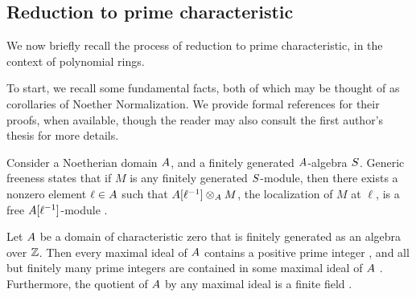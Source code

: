 \documentclass{amsart}
\begin{document}
 
\subsection{Reduction to prime characteristic}

We now briefly recall the process of reduction to prime characteristic, in the context of polynomial rings.

To start, we recall some fundamental facts, both of which may be thought of as corollaries of Noether Normalization.
We provide formal references for their proofs, when available, though the reader may also consult the first author's thesis \cite[Chapter~3]{hernandez.thesis} for more details.

\begin{remark}\label{generic-freeness}
   Consider a Noetherian domain $A$, and a finitely generated $A$-algebra $S$.
   Generic freeness states that if $M$ is any finitely generated $S$-module, then there exists a nonzero element  $\ell \in A$ such that $A[\ell^{-1}] \otimes_A M$, the localization of $M$ at $\ell$, is a free $A[\ell^{-1}]$-module \cite[Theorem~24.1]{matsumura}.
\end{remark}

\begin{remark}
   \label{maximal ideals: R}
   Let $A$ be a domain of characteristic zero that is finitely generated as an algebra over $\mathbb{Z}$.
   Then every maximal ideal of $A$ contains a positive prime integer \cite[V.3.4, Theorem~3(ii)]{bourbaki.commalg},
    and all but finitely many prime integers are contained in some maximal ideal of $A$ \cite[Corollary~3.2]{hernandez.thesis}.
   Furthermore, the quotient of $A$ by any maximal ideal is a finite field \cite[V.3.4, Corollary~1]{bourbaki.commalg}.
\end{remark}
\end{document}
